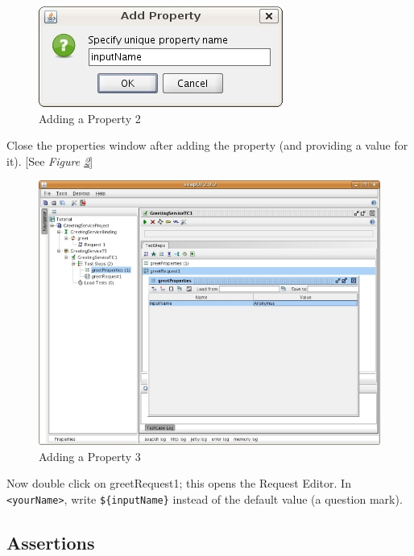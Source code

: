 \documentclass{article}
\begin{document}
\begin{figure}[!hbp]
\begin{center}
\includegraphics{fig/ARC1PythonDGDraft-img8.jpg}
\caption{Adding a Property 2}
\label{fig:addprop2}
\end{center}
\end{figure}

Close the properties window after adding the property (and providing a
value for it). [See \emph{Figure \ref{fig:addprop3}}]

\begin{figure}
\begin{center}
\includegraphics{fig/ARC1PythonDGDraft-img9_resize.jpg}
\caption{Adding a Property 3}
\label{fig:addprop3}
\end{center}
\end{figure}

Now double click on greetRequest1; this opens the Request Editor. In
\verb#<yourName>#, write \verb#${inputName}# instead of the default value
(a question mark).

\subsection{Assertions}
\label{sec:assertions}
\end{document}
